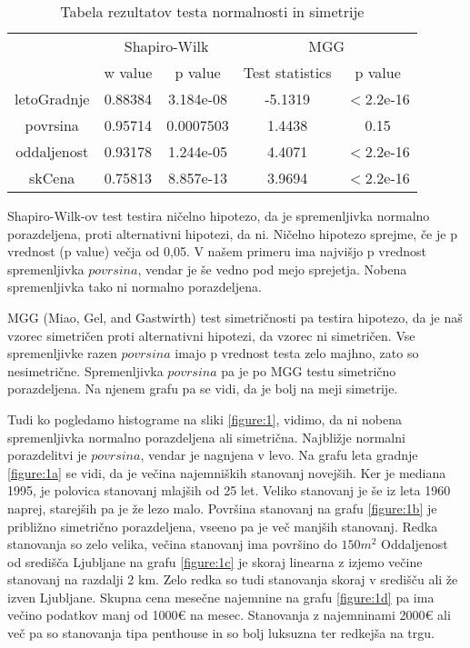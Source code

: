 \documentclass[a4paper, 12pt]{article}
\begin{document}
\begin{table}[H]
\begin{center}
\caption{Tabela rezultatov testa normalnosti in simetrije}
\label{table:3}
\begin{tabular}{ c|cc|cc }
	& \multicolumn{2}{c}{Shapiro-Wilk} & \multicolumn{2}{c}{MGG} \\
	& w value & p value & Test statistics & p value \\
	\hline
	letoGradnje &  0.88384 & 3.184e-08 & -5.1319 & $<$2.2e-16 \\
	povrsina & 0.95714 & 0.0007503 & 1.4438 & 0.15 \\
	oddaljenost & 0.93178 & 1.244e-05 & 4.4071 & $<$2.2e-16 \\
	skCena & 0.75813 & 8.857e-13 & 3.9694 & $<$2.2e-16 \\
\end{tabular}
\end{center}
\end{table}

Shapiro-Wilk-ov test testira ničelno hipotezo, da je spremenljivka normalno
porazdeljena, proti alternativni hipotezi, da ni. Ničelno hipotezo sprejme, če
je p vrednost (p value) večja od 0,05. V našem primeru ima najvišjo p vrednost
spremenljivka $ povrsina $, vendar je še vedno pod mejo sprejetja. Nobena
spremenljivka tako ni normalno porazdeljena.

MGG (Miao, Gel, and Gastwirth) test simetričnosti pa testira hipotezo, da
je naš vzorec simetričen proti alternativni hipotezi, da vzorec ni simetričen.
Vse spremenljivke razen $ povrsina $ imajo p vrednost testa zelo majhno,
zato so nesimetrične. Spremenljivka $ povrsina $ pa je po MGG testu simetrično
porazdeljena. Na njenem grafu pa se vidi, da je bolj na meji simetrije.

Tudi ko pogledamo histograme na sliki \ref{figure:1}, vidimo, da ni nobena
spremenljivka normalno porazdeljena ali simetrična. Najbližje normalni
porazdelitvi je $ povrsina $, vendar je nagnjena v levo. Na grafu leta
gradnje \ref{figure:1a} se vidi, da je večina najemniških stanovanj novejših.
Ker je mediana 1995, je polovica stanovanj mlajših od 25 let. Veliko stanovanj
je še iz leta 1960 naprej, starejših pa je že lezo malo. Površina stanovanj na
grafu \ref{figure:1b} je približno simetrično porazdeljena, vseeno pa je več
manjših stanovanj. Redka stanovanja so zelo velika, večina stanovanj ima
površino do $150 m^{2}$ Oddaljenost od središča Ljubljane na grafu
\ref{figure:1c} je skoraj linearna z izjemo večine stanovanj na razdalji 2 km.
Zelo redka so tudi stanovanja skoraj v središču ali že izven Ljubljane.
Skupna cena mesečne najemnine na grafu \ref{figure:1d} pa ima večino podatkov
manj od 1000€ na mesec. Stanovanja z najemninami 2000€ ali več pa so stanovanja
tipa penthouse in so bolj luksuzna ter redkejša na trgu.
\end{document}
